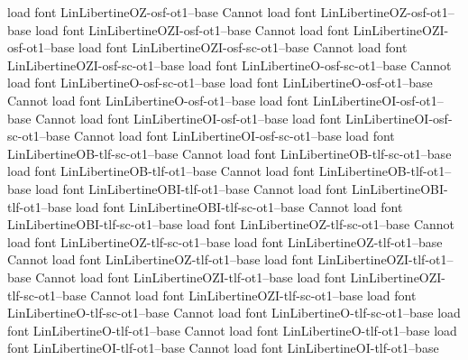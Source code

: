 {{{load font	LinLibertineOZ-osf-ot1--base
Cannot load font LinLibertineOZ-osf-ot1--base
load font	LinLibertineOZI-osf-ot1--base
Cannot load font LinLibertineOZI-osf-ot1--base
load font	LinLibertineOZI-osf-sc-ot1--base
Cannot load font LinLibertineOZI-osf-sc-ot1--base
load font	LinLibertineO-osf-sc-ot1--base
Cannot load font LinLibertineO-osf-sc-ot1--base
load font	LinLibertineO-osf-ot1--base
Cannot load font LinLibertineO-osf-ot1--base
load font	LinLibertineOI-osf-ot1--base
Cannot load font LinLibertineOI-osf-ot1--base
load font	LinLibertineOI-osf-sc-ot1--base
Cannot load font LinLibertineOI-osf-sc-ot1--base
load font	LinLibertineOB-tlf-sc-ot1--base
Cannot load font LinLibertineOB-tlf-sc-ot1--base
load font	LinLibertineOB-tlf-ot1--base
Cannot load font LinLibertineOB-tlf-ot1--base
load font	LinLibertineOBI-tlf-ot1--base
Cannot load font LinLibertineOBI-tlf-ot1--base
load font	LinLibertineOBI-tlf-sc-ot1--base
Cannot load font LinLibertineOBI-tlf-sc-ot1--base
load font	LinLibertineOZ-tlf-sc-ot1--base
Cannot load font LinLibertineOZ-tlf-sc-ot1--base
load font	LinLibertineOZ-tlf-ot1--base
Cannot load font LinLibertineOZ-tlf-ot1--base
load font	LinLibertineOZI-tlf-ot1--base
Cannot load font LinLibertineOZI-tlf-ot1--base
load font	LinLibertineOZI-tlf-sc-ot1--base
Cannot load font LinLibertineOZI-tlf-sc-ot1--base
load font	LinLibertineO-tlf-sc-ot1--base
Cannot load font LinLibertineO-tlf-sc-ot1--base
load font	LinLibertineO-tlf-ot1--base
Cannot load font LinLibertineO-tlf-ot1--base
load font	LinLibertineOI-tlf-ot1--base
Cannot load font LinLibertineOI-tlf-ot1--base
}}}
